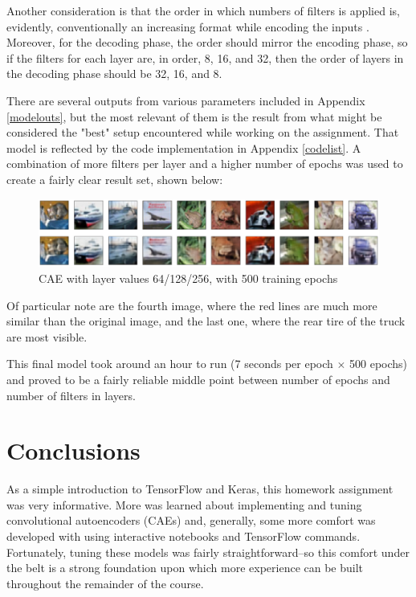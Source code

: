 \documentclass{article}
\begin{document}
\par Another consideration is that the order in which numbers of filters is applied is, evidently, conventionally an increasing format while encoding the inputs \cite{KerasLayers}.
Moreover, for the decoding phase, the order should mirror the encoding phase, so if the filters for each layer are, in order, 8, 16, and 32, then the order of layers in the decoding phase should be 32, 16, and 8.

\par There are several outputs from various parameters included in Appendix \ref{modelouts}, but the most relevant of them is the result from what might be considered the "best" setup encountered while working on the assignment.
That model is reflected by the code implementation in Appendix \ref{codelist}. A combination of more filters per layer and a higher number of epochs was used to create a fairly clear result set, shown below:
\begin{figure}[H]
    \centering
    \includegraphics[width=4.75in]{csci-8110/hw-1/hw1-images/64-128-256-500.png}
    \caption{CAE with layer values 64/128/256, with 500 training epochs}
    \label{fig:final}
\end{figure}
\par Of particular note are the fourth image, where the red lines are much more similar than the original image, and the last one, where the rear tire of the truck are most visible.

\par This final model took around an hour to run (7 seconds per epoch $\times$ 500 epochs) and proved to be a fairly reliable middle point between number of epochs and number of filters in layers. 

\section{Conclusions}
As a simple introduction to TensorFlow and Keras, this homework assignment was very informative.
More was learned about implementing and tuning convolutional autoencoders (CAEs) and, generally, some more comfort was developed with using interactive notebooks and TensorFlow commands.
Fortunately, tuning these models was fairly straightforward--so this comfort under the belt is a strong foundation upon which more experience can be built throughout the remainder of the course.
\end{document}
